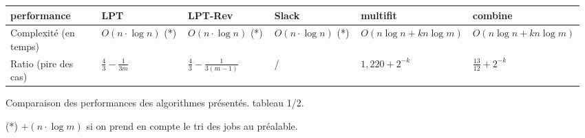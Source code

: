 \documentclass[a4paper,12pt]{report}
\theoremstyle{plain}				%
\theoremstyle{definition}				%
\begin{document}
\begin{center}
\begin{tabular}{p{0.17\linewidth}
				p{0.16\linewidth}
				p{0.16\linewidth}
				p{0.16\linewidth}
				p{0.16\linewidth}
				p{0.16\linewidth}}

\hline
performance 						&
							LPT 	&
							LPT-Rev &
							Slack 	&
							multifit&
							combine
\\ \hline

Complexité \newline (en temps) 		&
							$O(n \cdot \log n) $ (*) &		%
							$O(n \cdot \log n)$  (*) & 			%
							$O(n \cdot \log n)$  (*) & 			%
							$O(n \log n + kn \log m)$& 		%
							$O(n \log n + kn \log m)$		%

\\	\hline
Ratio \newline (pire des cas)		&
							$\frac{4}{3} - \frac{1}{3m}$&		%
							$\frac{4}{3} - \frac{1}{3(m-1)}$&	%
							/&								%
							$1,220 + 2^{-k}$& 					%
							$\frac{13}{12} + 2^{-k}$			%
\\
\hline
\end{tabular}
Comparaison des performances des algorithmes présentés. tableau 1/2.

(*) $+ (n \cdot \log m)$ si on prend en compte le tri des jobs au préalable.
\end{center}
\end{document}
